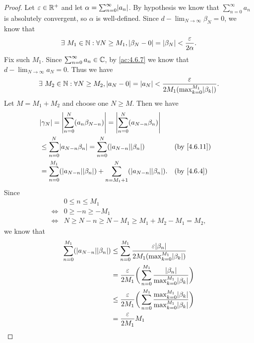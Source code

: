 \begin{proof}
  Let \(\varepsilon \in \mathbb{R}^+\) and let \(\alpha = \sum_{n = 0}^\infty \abs{a_n}\).
  By hypothesis we know that \(\sum_{n = 0}^\infty a_n\) is absolutely convergent, so \(\alpha\) is well-defined.
  Since \(d - \lim_{N \to \infty} \beta_N = 0\), we know that
  \[
    \exists\ M_1 \in \mathbb{N} : \forall N \geq M_1, \left\lvert\beta_N - 0\right\rvert = \left\lvert\beta_N\right\rvert < \dfrac{\varepsilon}{2 \alpha}.
  \]
  Fix such \(M_1\).
  Since \(\sum_{n = 0}^\infty a_n \in \mathbb{C}\), by \cref{ac:4.6.7} we know that \(d - \lim_{N \to \infty} a_N = 0\).
  Thus we have
  \[
    \exists\ M_2 \in \N : \forall N \geq M_2, \abs{a_N - 0} = \abs{a_N} < \dfrac{\varepsilon}{2 M_1 (\max_{k = 0}^{M_1} \abs{\beta_k})}.
  \]
  Let \(M = M_1 + M_2\) and choose one \(N \geq M\).
  Then we have
  \begin{align*}
     & \abs{\gamma_N} = \abs{\sum_{n = 0}^N (a_n \beta_{N - n})} = \abs{\sum_{n = 0}^N (a_{N - n} \beta_n)}                                        \\
     & \leq \sum_{n = 0}^N \abs{a_{N - n} \beta_n} = \sum_{n = 0}^N (\abs{a_{N - n}} \abs{\beta_n})                 &  & \text{(by \cref{4.6.11})} \\
     & = \sum_{n = 0}^{M_1} (\abs{a_{N - n}} \abs{\beta_n}) + \sum_{n = M_1 + 1}^N (\abs{a_{N - n}} \abs{\beta_n}). &  & \by{4.6.4}
  \end{align*}
  Since
  \begin{align*}
         & 0 \leq n \leq M_1                                     \\
    \iff & 0 \geq -n \geq -M_1                                   \\
    \iff & N \geq N - n \geq N - M_1 \geq M_1 + M_2 - M_1 = M_2,
  \end{align*}
  we know that
  \begin{align*}
    \sum_{n = 0}^{M_1} (\abs{a_{N - n}} \abs{\beta_n}) & \leq \sum_{n = 0}^{M_1} \dfrac{\varepsilon \abs{\beta_n}}{2 M_1 (\max_{k = 0}^{M_1} \abs{\beta_k})}                                       \\
                                                       & = \dfrac{\varepsilon}{2 M_1} \bigg(\sum_{n = 0}^{M_1} \dfrac{\abs{\beta_n}}{\max_{k = 0}^{M_1} \abs{\beta_k}}\bigg)                       \\
                                                       & \leq \dfrac{\varepsilon}{2 M_1} \bigg(\sum_{n = 0}^{M_1} \dfrac{\max_{k = 0}^{M_1} \abs{\beta_k}}{\max_{k = 0}^{M_1} \abs{\beta_k}}\bigg) \\
                                                       & = \dfrac{\varepsilon}{2 M_1} M_1                                                                                                          \\

\end{align*}
\end{proof}
